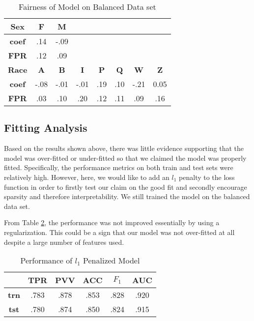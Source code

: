 \begin{table}[htb]
\centering
\begin{tabular}{cccccccc}
\hline
\textbf{Sex} & \textbf{F} & \textbf{M} &            &            &            &            &            \\ \hline
\textbf{coef}   & .14        & -.09        &            &            &            &            &            \\
\textbf{FPR}    & .12        & .09        &            &            &            &            &            \\ \hline
\textbf{Race}       & \textbf{A} & \textbf{B} & \textbf{I} & \textbf{P} & \textbf{Q} & \textbf{W} & \textbf{Z} \\ \hline
\textbf{coef}   & -.08         & -.01        & -.01       & .19        & .10         & -.21         & 0.05       \\
\textbf{FPR}    & .03        & .10       & .20        & .12        & .11        & .09        & .16   \\  \hline  
\end{tabular}
\caption{Fairness of Model on Balanced Data set}
    \label{Table:Fairness metric-bal}
\end{table}


\subsection{Fitting Analysis}
Based on the results shown above, there was little evidence supporting that the model was over-fitted or under-fitted so that we claimed the model was properly fitted. Specifically, the performance metrics on both train and test sets were relatively high. However, here, we would like to add an $l_1$ penalty to the loss function in order to firstly test our claim on the good fit and secondly encourage sparsity and therefore interpretability. We still trained the model on the balanced data set.

From Table \ref{Table:metric metric-bal-l1}, the performance was not improved essentially by using a regularization. This could be a sign that our model was not over-fitted at all despite a large number of features used.

\begin{table}[htb]
    \centering
\begin{tabular}{@{}cccccc@{}}
\hline
             & \textbf{TPR} & \textbf{PVV} & \textbf{ACC} & \textbf{$F_1$} & \textbf{AUC} \\
\hline
\textbf{trn} & .783         & .878         & .853         & .828        & .920         \\
\textbf{tst} & .780         & .874         & .850         & .824        & .915\\ \hline
\end{tabular}
\caption{Performance of $l_1$ Penalized Model}
    \label{Table:metric metric-bal-l1}
\end{table}

